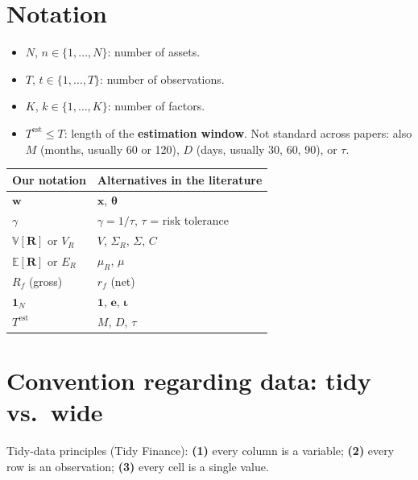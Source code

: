 \documentclass[11pt,a4paper]{report}
\newcommand{\E}{\mathbb{E}}
\newcommand{\V}{\mathbb{V}}
\newcommand{\one}{\mathbf{1}_N}
\newcommand{\w}{\bm{w}}
\newcommand{\R}{\bm{R}}
\newcommand{\Rf}{R_f}
\begin{document}
\section{Notation}
\begin{itemize}
  \item $N$, $n\in\{1,\dots,N\}$: number of assets.
  \item $T$, $t\in\{1,\dots,T\}$: number of observations.
  \item $K$, $k\in\{1,\dots,K\}$: number of factors.
  \item $T^{\text{est}}\le T$: length of the \textbf{estimation window}. Not
    standard across papers: also $M$ (months, usually 60 or 120), $D$ (days,
    usually 30, 60, 90), or $\tau$.
\end{itemize}
\begin{center}
\begin{tabular}{@{}ll@{}}
\toprule
Our notation & Alternatives in the literature \\
\midrule
$\w$ & $\bm{x}$, $\bm\theta$ \\
$\gamma$ & $\gamma=1/\tau$, $\tau$ = risk tolerance \\
$\V[\R]$ or $V_R$ & $V$, $\Sigma_R$, $\Sigma$, $C$ \\
$\E[\R]$ or $E_R$ & $\mu_R$, $\mu$ \\
$\Rf$ (gross) & $r_f$ (net) \\
$\one$ & $\bm 1$, $\bm e$, $\bm\iota$ \\
$T^{\text{est}}$ & $M$, $D$, $\tau$ \\
\bottomrule
\end{tabular}
\end{center}

\section{Convention regarding data: tidy vs.\ wide}
Tidy-data principles (Tidy Finance): \textbf{(1)} every column is a variable;
\textbf{(2)} every row is an observation; \textbf{(3)} every cell is a single value.
\end{document}
